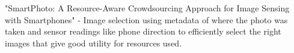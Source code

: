 


"SmartPhoto: A Resource-Aware Crowdsourcing Approach for Image Sensing with Smartphones" \cite{wang2014smartphoto} - Image selection using metadata of where the photo was taken and sensor readings like phone direction to efficiently select the right images that give good utility for resources used.

%
%
%
%

